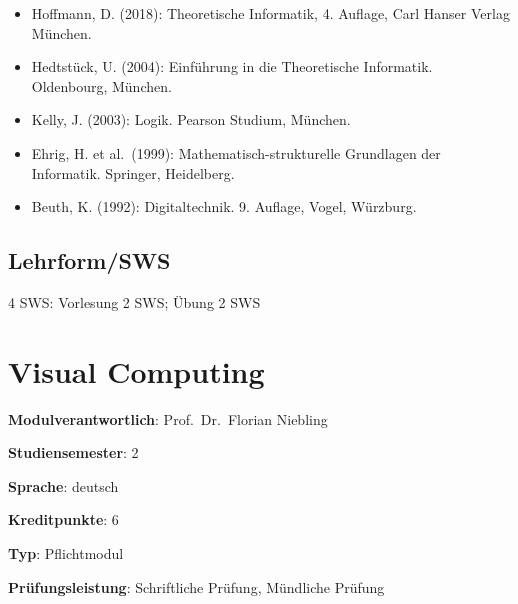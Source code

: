 \begin{itemize}
\tightlist
\item
  Hoffmann, D. (2018): Theoretische Informatik, 4. Auflage, Carl Hanser
  Verlag München.
\item
  Hedtstück, U. (2004): Einführung in die Theoretische Informatik.
  Oldenbourg, München.
\item
  Kelly, J. (2003): Logik. Pearson Studium, München.
\item
  Ehrig, H. et al.~(1999): Mathematisch-strukturelle Grundlagen der
  Informatik. Springer, Heidelberg.
\item
  Beuth, K. (1992): Digitaltechnik. 9. Auflage, Vogel, Würzburg.
\end{itemize}

\hypertarget{lehrformswspathlabel....srcmodulbeschreibungen-bachelor-bpo5ba_theoretischeinformatik}{%
\section*{Lehrform/SWS\label{../../src/modulbeschreibungen-bachelor-bpo5/BA_TheoretischeInformatik}}\label{lehrformswspathlabel....srcmodulbeschreibungen-bachelor-bpo5ba_theoretischeinformatik}}

4 SWS: Vorlesung 2 SWS; Übung 2 SWS

\hypertarget{visual-computingpathlabel....srcmodulbeschreibungen-bachelor-bpo5ba_visual-computing}{%
\chapter{Visual
Computing\label{../../src/modulbeschreibungen-bachelor-bpo5/BA_Visual-Computing}}\label{visual-computingpathlabel....srcmodulbeschreibungen-bachelor-bpo5ba_visual-computing}}

\begin{modulHead}
\textbf{Modulverantwortlich}: Prof.~Dr.~Florian
Niebling
\end{modulHead}
\begin{modulHead}
\textbf{Studiensemester}:
2
\end{modulHead}
\begin{modulHead}
\textbf{Sprache}:
deutsch
\end{modulHead}
\begin{modulHead}
\textbf{Kreditpunkte}:
6
\end{modulHead}
\begin{modulHead}
\textbf{Typ}:
Pflichtmodul
\end{modulHead}
\begin{modulHead}
\textbf{Prüfungsleistung}:
Schriftliche Prüfung, Mündliche Prüfung
\end{modulHead}


